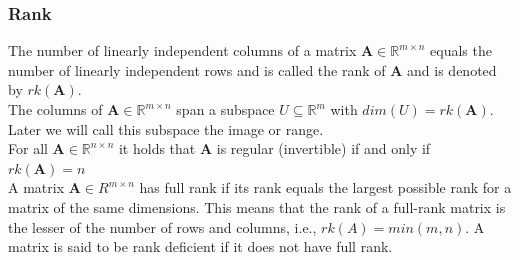 \subsubsection*{Rank}
The number of linearly independent columns of a matrix $\mathbf{A} \in \mathbb{R}^{m\times n}$ equals the number of linearly independent rows and is called the rank of $\mathbf{A}$ and is denoted by $rk(\mathbf{A})$.\\
The columns of $\mathbf{A} \in \mathbb{R}^{m\times n}$ span a subspace $U \subseteq \mathbb{R}^m$ with $dim(U) = rk(\mathbf{A})$. Later we will call this subspace the image or range.\\
For all $\mathbf{A} \in \mathbb{R}^{n\times n}$ it holds that $\mathbf{A}$ is regular (invertible) if and only if $rk(\mathbf{A}) = n$\\
A matrix $\mathbf{A} \in R^{m\times n}$ has full rank if its rank equals the largest possible rank for a matrix of the same dimensions. This means that the rank of
a full-rank matrix is the lesser of the number of rows and columns, i.e.,
$rk(A) = min(m, n)$. A matrix is said to be rank deficient if it does not
have full rank.

